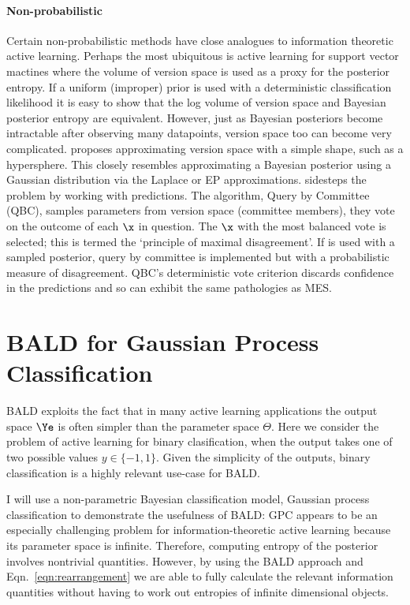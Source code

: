 \paragraph{Non-probabilistic} Certain non-probabilistic methods have close analogues to information theoretic active learning. Perhaps the most ubiquitous is active learning for support vector mactines \citep[SVM,][]{tong2001,seung1992} where the volume of version space is used as a proxy for the posterior entropy. If a uniform (improper) prior is used with a deterministic classification likelihood it is easy to show that the log volume of version space and Bayesian posterior entropy are equivalent. However, just as Bayesian posteriors become intractable after observing many datapoints, version space too can become very complicated. \citep{tong2001} proposes approximating version space with a simple shape, such as a hypersphere. This closely resembles approximating a Bayesian posterior using a Gaussian distribution via the Laplace or EP approximations. \citep{seung1992} sidesteps the problem by working with predictions. The algorithm, Query by Committee (QBC), samples parameters from version space (committee members), they vote on the outcome of each $\x$ in question. The $\x$ with the most balanced vote is selected; this is termed the `principle of maximal disagreement'. If \ourmethod is used with a sampled posterior, query by committee is implemented but with a probabilistic measure of disagreement. QBC's deterministic vote criterion discards confidence in the predictions and so can exhibit the same pathologies as MES.


\section{BALD for Gaussian Process Classification}

BALD exploits the fact that in many active learning applications the output space $\Ye$ is often simpler than the parameter space $\Theta$. Here we consider the problem of active learning for binary clasification, when the output takes one of two possible values $y \in \{-1,1\}$. Given the simplicity of the outputs, binary classification is a highly relevant use-case for BALD.

I will use a non-parametric Bayesian classification model, Gaussian process classification \citep[GPC,][]{rasmussen06GP} to demonstrate the usefulness of BALD: GPC appears to be an especially challenging problem for information-theoretic active learning because its parameter space is infinite. Therefore, computing entropy of the posterior involves nontrivial quantities. However, by using the BALD approach and Eqn.\ \eqref{eqn:rearrangement} we are able to fully calculate the relevant information quantities without having to work out entropies of infinite dimensional objects. 



